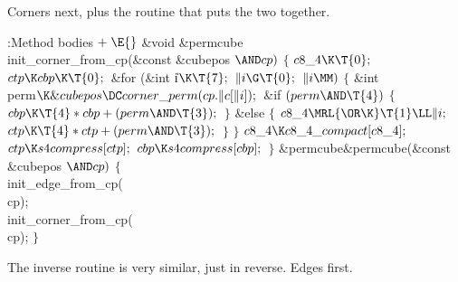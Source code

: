 Corners next, plus the routine that puts the two together.

\Y\B\4:Method bodies\X${}\mathrel+\E{}$\6
\&{void} \&{permcube}\DC\\{init\_corner\_from\_cp}(\&{const} \&{cubepos} ${}{%
\AND}\\{cp}){}$\1\1\2\2\6
${}\{{}$\1\6
${}\\{c8\_4}\K\T{0};{}$\6
${}\\{ctp}\K\\{cbp}\K\T{0};{}$\6
\&{for} (\&{int} \|i${}\K\T{7};{}$ ${}\|i\G\T{0};{}$ ${}\|i\MM){}$\5
${}\{{}$\1\6
\&{int} \\{perm}${}\K\&{cubepos}\DC\\{corner\_perm}(\\{cp}.\|c[\|i]);{}$\7
\&{if} ${}(\\{perm}\AND\T{4}){}$\5
${}\{{}$\1\6
${}\\{cbp}\K\T{4}*\\{cbp}+(\\{perm}\AND\T{3});{}$\6
\4${}\}{}$\2\6
\&{else}\5
${}\{{}$\1\6
${}\\{c8\_4}\MRL{{\OR}{\K}}\T{1}\LL\|i;{}$\6
${}\\{ctp}\K\T{4}*\\{ctp}+(\\{perm}\AND\T{3});{}$\6
\4${}\}{}$\2\6
\4${}\}{}$\2\6
${}\\{c8\_4}\K\\{c8\_4\_compact}[\\{c8\_4}];{}$\6
${}\\{ctp}\K\\{s4compress}[\\{ctp}];{}$\6
${}\\{cbp}\K\\{s4compress}[\\{cbp}];{}$\6
\4${}\}{}$\2\7
\&{permcube}\DC\&{permcube}(\&{const} \&{cubepos} ${}{\AND}\\{cp}){}$\1\1\2\2\6
${}\{{}$\1\6
\\{init\_edge\_from\_cp}(\\{cp});\6
\\{init\_corner\_from\_cp}(\\{cp});\6
\4${}\}{}$\2\par
\fi

The inverse routine is very similar, just in reverse.  Edges
first.

